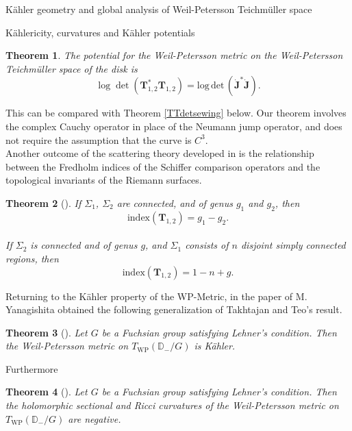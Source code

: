\documentclass[12pt]{amsart}
\newcommand{\disk}{\ensuremath{\mathbb{D}} } %
\theoremstyle{plain}
\newtheorem{theorem}{Theorem}[section]
\theoremstyle{definition}
\theoremstyle{remark}
\numberwithin{equation}{section} %
\numberwithin{figure}{section} %
\begin{document}
\begin{section}{K\"ahler geometry and global analysis of Weil-Petersson Teichm\"uller space}
\begin{subsection}{K\"ahlericity, curvatures and K\"ahler potentials}
\begin{theorem} \cite{Schipp-Staub-Kenig}\label{th:new_Kahler_potential}
    The potential for the Weil-Petersson metric on the Weil-Petersson Teichm\"uller space of the disk is 
    \begin{equation}
        \log \det (\mathbf{T}_{1,2}^* \mathbf{T}_{1,2})= \mathrm{log} \, \mathrm{det} \, \left( \dot{\mathbf{J}}^* \dot{\mathbf{J}} \right).
    \end{equation}
\end{theorem}


This can be compared with Theorem \ref{TTdetsewing} below. Our theorem involves the complex Cauchy operator in place of the Neumann jump operator, and does not require the assumption that the curve is $C^3$. \\

Another outcome of the scattering theory developed in \cite{Schippers_Staubach_scattering} is the relationship between the Fredholm indices of the Schiffer comparison operators and the topological invariants of the Riemann surfaces. 

\begin{theorem}[\cite{Schippers_Staubach_scattering}]
 If $\Sigma_1$, $\Sigma_2$ { are connected, and} of genus $g_1$ and $g_2$, 	then $$\mathrm{index}(\mathbf{T}_{1,2}) = g_1 - g_2 .$$\\
 If $\Sigma_2$ { is connected and} of genus $g$, and $\Sigma_1$ consists of $n$ disjoint simply connected regions, then  $$\mathrm{index}(\mathbf{T}_{1,2}) = 1-n+g.$$
\end{theorem}


Returning to the K\"ahler property of the WP-Metric, in the paper \cite{Yanagishita_Kahler} of M. Yanagishita obtained the following generalization of Takhtajan and Teo's result. 
\begin{theorem}[\cite{Yanagishita_Kahler}] Let $G$ be a Fuchsian group satisfying Lehner's condition. Then the Weil-Petersson metric on $T_{\mathrm{WP}}(\disk_-/G)$ is K\"ahler. 
\end{theorem}
Furthermore
\begin{theorem}[\cite{Yanagishita_Kahler}] Let $G$ be a Fuchsian group satisfying Lehner's condition. Then the holomorphic sectional and Ricci curvatures of the Weil-Petersson metric on $T_{\mathrm{WP}}(\disk_-/G)$ are negative.
\end{theorem}  
 
\end{subsection}



\end{section}
\end{document}

